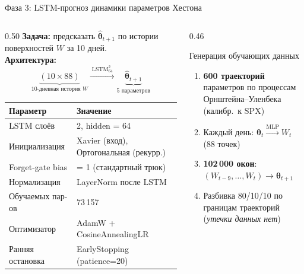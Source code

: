 \documentclass[aspectratio=169, 10pt]{beamer}
\begin{document}
\begin{frame}{Фаза 3: LSTM-прогноз динамики параметров Хестона}
  \begin{columns}[T]

    \begin{column}{0.50\textwidth}
      \textbf{Задача:} предсказать $\hat{\boldsymbol\theta}_{t+1}$ по истории
      поверхностей $W$ за 10 дней.\\[0.4em]

      \textbf{Архитектура:}
      \[
        \underbrace{(10 \times 88)}_{\text{10-дневная история }W}
        \xrightarrow{\;\text{LSTM}_{64}^{2}\;}
        \underbrace{\hat{\boldsymbol\theta}_{t+1}}_{5\text{ параметров}}
      \]
      \begin{center}\scriptsize
      \begin{tabular}{@{}ll@{}}
        \toprule
        Параметр          & Значение \\ \midrule
        LSTM слоёв        & 2, hidden = 64 \\
        Инициализация     & Xavier (вход), Ортогональная (рекурр.) \\
        Forget-gate bias  & = 1 (стандартный трюк) \\
        Нормализация      & LayerNorm после LSTM \\
        Обучаемых пар-ов  & 73\,157 \\
        Оптимизатор       & AdamW + CosineAnnealingLR \\
        Ранняя остановка  & EarlyStopping (patience=20) \\
        \bottomrule
      \end{tabular}
      \end{center}
    \end{column}

    \begin{column}{0.46\textwidth}
      \begin{block}{Генерация обучающих данных}
        \small
        \begin{enumerate}
          \item \textbf{600 траекторий} параметров по процессам\\
                Орнштейна--Уленбека (калибр.\ к SPX)
          \item Каждый день: $\boldsymbol\theta_t
                \xrightarrow{\text{MLP}} W_t$ (88 точек)
          \item \textbf{102\,000 окон}: $(W_{t-9},\ldots,W_t)
                \to \boldsymbol\theta_{t+1}$
          \item Разбивка 80/10/10 по границам траекторий\\
                (\textit{утечки данных нет})
        \end{enumerate}
      \end{block}


\end{column}
\end{columns}
\end{frame}
\end{document}
